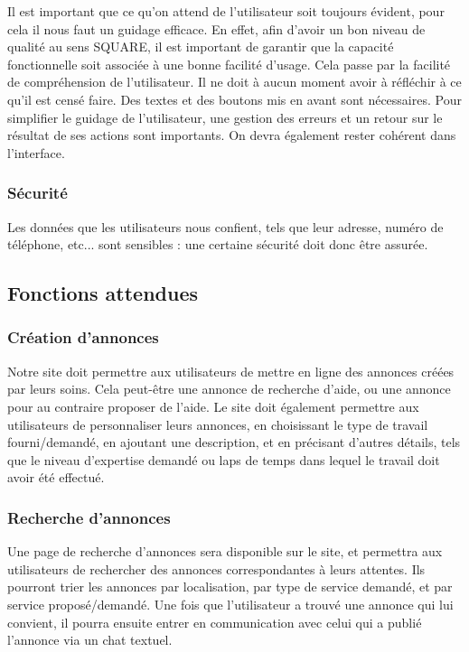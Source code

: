 \documentclass[a4paper,11pt]{article}
\begin{document}
Il est important que ce qu’on attend de l’utilisateur soit toujours évident, pour cela il nous faut un
guidage efficace. En effet, afin d’avoir un bon niveau de qualité au sens SQUARE, il est important de
garantir que la capacité fonctionnelle soit associée à une bonne facilité d’usage. Cela passe par la
facilité de compréhension de l’utilisateur. Il ne doit à aucun moment avoir à réfléchir à ce qu’il est
censé faire. Des textes et des boutons mis en avant sont nécessaires. Pour simplifier le guidage de
l’utilisateur, une gestion des erreurs et un retour sur le résultat de ses actions sont importants. On
devra également rester cohérent dans l’interface.\\

\subsubsection{Sécurité}

Les données que les utilisateurs nous confient, tels que leur adresse, numéro de téléphone, etc... sont
sensibles : une certaine sécurité doit donc être assurée.\\

\subsection{Fonctions attendues}

\subsubsection{Création d’annonces}

Notre site doit permettre aux utilisateurs de mettre en ligne des annonces créées par leurs soins. Cela
peut-être une annonce de recherche d’aide, ou une annonce pour au contraire proposer de l’aide. Le
site doit également permettre aux utilisateurs de personnaliser leurs annonces, en choisissant le type
de travail fourni/demandé, en ajoutant une description, et en précisant d’autres détails, tels que le
niveau d’expertise demandé ou laps de temps dans lequel le travail doit avoir été effectué.\\

\subsubsection{Recherche d’annonces}

Une page de recherche d’annonces sera disponible sur le site, et permettra aux utilisateurs de
rechercher des annonces correspondantes à leurs attentes. Ils pourront trier les annonces par
localisation, par type de service demandé, et par service proposé/demandé. Une fois que l’utilisateur
a trouvé une annonce qui lui convient, il pourra ensuite entrer en communication avec celui qui a
publié l’annonce via un chat textuel.\\
\end{document}
